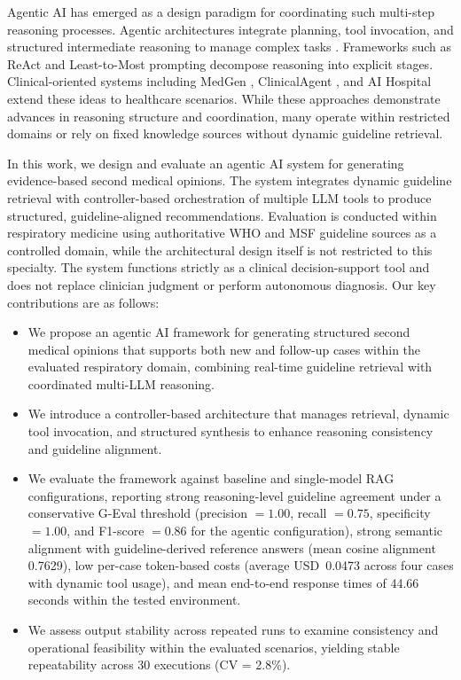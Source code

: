 \documentclass[preprint,12pt]{elsarticle}
\begin{document}
Agentic AI has emerged as a design paradigm for coordinating such multi-step reasoning processes. Agentic architectures integrate planning, tool invocation, and structured intermediate reasoning to manage complex tasks \cite{agenticintro1,agenticintro2,agenticintro3}. Frameworks such as ReAct \cite{r35} and Least-to-Most prompting \cite{r36} decompose reasoning into explicit stages. Clinical-oriented systems including MedGen \cite{r22}, ClinicalAgent \cite{r20}, and AI Hospital \cite{r21} extend these ideas to healthcare scenarios. While these approaches demonstrate advances in reasoning structure and coordination, many operate within restricted domains or rely on fixed knowledge sources without dynamic guideline retrieval.

In this work, we design and evaluate an agentic AI system for generating evidence-based second medical opinions. The system integrates dynamic guideline retrieval with controller-based orchestration of multiple LLM tools to produce structured, guideline-aligned recommendations. Evaluation is conducted within respiratory medicine using authoritative WHO and MSF guideline sources as a controlled domain, while the architectural design itself is not restricted to this specialty. The system functions strictly as a clinical decision-support tool and does not replace clinician judgment or perform autonomous diagnosis. Our key contributions are as follows:

\begin{itemize}

\item We propose an agentic AI framework for generating structured second medical opinions that supports both new and follow-up cases within the evaluated respiratory domain, combining real-time guideline retrieval with coordinated multi-LLM reasoning.

\item We introduce a controller-based architecture that manages retrieval, dynamic tool invocation, and structured synthesis to enhance reasoning consistency and guideline alignment.

\item We evaluate the framework against baseline and single-model RAG configurations, reporting strong reasoning-level guideline agreement under a conservative G-Eval threshold (precision \(=1.00\), recall \(=0.75\), specificity \(=1.00\), and F1-score \(=0.86\) for the agentic configuration), strong semantic alignment with guideline-derived reference answers (mean cosine alignment 0.7629), low per-case token-based costs (average USD~0.0473 across four cases with dynamic tool usage), and mean end-to-end response times of 44.66 seconds within the tested environment.

\item We assess output stability across repeated runs to examine consistency and operational feasibility within the evaluated scenarios, yielding stable repeatability across 30 executions (CV = 2.8\%).

\end{itemize}
\end{document}
